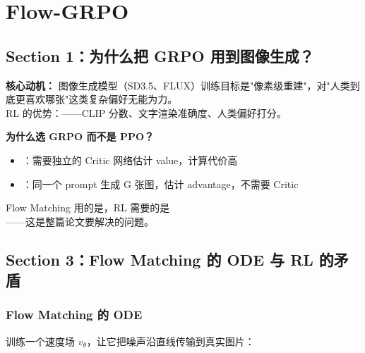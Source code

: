 
\section{Flow-GRPO}

\subsection{Section 1：为什么把 GRPO 用到图像生成？}

\begin{conceptbox}
\textbf{核心动机：} 图像生成模型（SD3.5、FLUX）训练目标是"像素级重建"，对"人类到底更喜欢哪张"这类复杂偏好无能为力。\\
RL 的优势：——CLIP 分数、文字渲染准确度、人类偏好打分。
\end{conceptbox}

\textbf{为什么选 GRPO 而不是 PPO？}

\begin{itemize}[leftmargin=1.5em]
  \item {}：需要独立的 Critic 网络估计 value，计算代价高
  \item {}：同一个 prompt 生成 G 张图，估计 advantage，不需要 Critic
\end{itemize}

\begin{warnbox}
 Flow Matching 用的是，RL 需要的是\\
——这是整篇论文要解决的问题。
\end{warnbox}

\subsection{Section 3：Flow Matching 的 ODE 与 RL 的矛盾}

\subsubsection{Flow Matching 的 ODE}

训练一个速度场 $v_\theta$，让它把噪声沿直线传输到真实图片：

